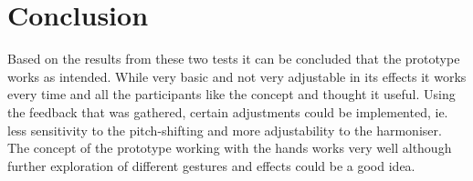 \section{Conclusion}
Based on the results from these two tests it can be concluded that the prototype works as intended. While very basic and not very adjustable in its effects it works every time and all the participants like the concept and thought it useful. Using the feedback that was gathered, certain adjustments could be implemented, ie. less sensitivity to the pitch-shifting and more adjustability to the harmoniser. The concept of the prototype working with the hands works very well although further exploration of different gestures and effects could be a good idea. 


